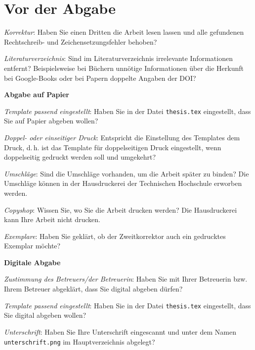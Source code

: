 \section{Vor der Abgabe}

\begin{checklist}
  \footnotesize
  \item \textit{Korrektur}: Haben Sie einen Dritten die Arbeit lesen lassen und alle gefundenen Rechtschreib- und Zeichensetzungsfehler behoben?
  \item \textit{Literaturverzeichnis}: Sind im Literaturverzeichnis irrelevante Informationen entfernt? Beispielsweise bei Büchern unnötige Informationen über die Herkunft bei Google-Books oder bei Papern doppelte Angaben der DOI?
  \item \textbf{Abgabe auf Papier}
  \begin{checklist}
    \item \textit{Template passend eingestellt}: Haben Sie in der Datei \texttt{thesis.tex} eingestellt, dass Sie auf Papier abgeben wollen?
    \item \textit{Doppel- oder einseitiger Druck}: Entspricht die Einstellung des Templates dem Druck, d.\,h. ist das Template für doppelseitigen Druck eingestellt, wenn doppelseitig gedruckt werden soll und umgekehrt?
    \item \textit{Umschläge}: Sind die Umschläge vorhanden, um die Arbeit später zu binden? Die Umschläge können in der Hausdruckerei der Technischen Hochschule erworben werden.
    \item \textit{Copyshop}: Wissen Sie, wo Sie die Arbeit drucken werden? Die Hausdruckerei kann Ihre Arbeit nicht drucken.
    \item \textit{Exemplare}: Haben Sie geklärt, ob der Zweitkorrektor auch ein gedrucktes Exemplar möchte?
  \end{checklist}
  \item \textbf{Digitale Abgabe}
  \begin{checklist}
    \item \textit{Zustimmung des Betreuers/der Betreuerin}: Haben Sie mit Ihrer Betreuerin bzw. Ihrem Betreuer abgeklärt, dass Sie digital abgeben dürfen?
    \item \textit{Template passend eingestellt}: Haben Sie in der Datei \texttt{thesis.tex} eingestellt, dass Sie digital abgeben wollen?
    \item \textit{Unterschrift}: Haben Sie Ihre Unterschrift eingescannt und unter dem Namen \texttt{unterschrift.png} im Hauptverzeichnis abgelegt?
  \end{checklist}
\end{checklist}
